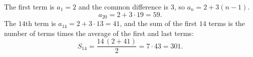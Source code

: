The first term is $a_1=2$ and the common difference is $3$, so $a_n=2+3(n-1)$.
\[
a_{20}=2+3\cdot19=\boxed{59}.
\]
The $14$th term is $a_{14}=2+3\cdot13=41$, and the sum of the first $14$ terms is the number of terms times the average of the first and last terms:
\[
S_{14}=\dfrac{14\,(2+41)}{2}=7\cdot43=\boxed{301}.
\]
